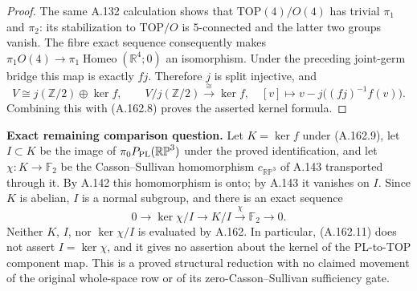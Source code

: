 \begin{proof}
The same A.132 calculation shows that
$\mathrm{TOP}(4)/O(4)$ has trivial $\pi_1$ and $\pi_2$: its stabilization
to $\mathrm{TOP}/O$ is $5$-connected and the latter two groups vanish.
The fibre exact sequence consequently makes
$\pi_1O(4)\to\pi_1\operatorname{Homeo}(\mathbb R^4;0)$ an isomorphism.
Under the preceding joint-germ bridge this map is exactly $fj$.
Therefore $j$ is split injective, and
\[
 V\cong j(\mathbb Z/2)\oplus\ker f,
 \qquad
 V/j(\mathbb Z/2)\xrightarrow{\ \cong\ }\ker f,
 \quad [v]\longmapsto v-j\bigl((fj)^{-1}f(v)\bigr).
 \tag{A.162.10}
\]
Combining this with (A.162.8) proves the asserted kernel formula.
\end{proof}

\textbf{Exact remaining comparison question.}\quad
Let $K=\ker f$ under (A.162.9), let
$I\subset K$ be the image of $\pi_0P_{\rm PL}(\mathbb {RP}^3)$ under the
proved identification, and let $\chi:K\to\mathbb F_2$ be the
Casson--Sullivan homomorphism $c_{\mathbb {RP}^3}$ of A.143 transported
through it. By A.142 this homomorphism is onto; by A.143 it vanishes on
$I$. Since $K$ is abelian, $I$ is a normal subgroup, and there is an
exact sequence
\[
 0\longrightarrow\ker\chi/I\longrightarrow K/I
       \xrightarrow{\ \chi\ }\mathbb F_2\longrightarrow0.
 \tag{A.162.11}
\]
Neither $K$, $I$, nor $\ker\chi/I$ is evaluated by A.162. In particular,
(A.162.11) does not assert $I=\ker\chi$, and it gives no assertion about
the kernel of the PL-to-TOP component map. This is a proved structural
reduction with no claimed movement of the original whole-space row or
of its zero-Casson--Sullivan sufficiency gate.

